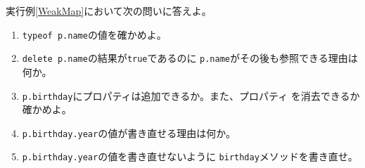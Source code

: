 \begin{Prob}\upshape
実行例\else\ref{WeakMap}\fi において次の問いに答えよ。
\begin{enumerate}
   \item \texttt{typeof p.name}の値を確かめよ。\ifText\vspace{0.03\textheight}\fi
   \item \texttt{delete p.name}の結果が\texttt{true}であるのに
         \texttt{p.name}がその後も参照できる理由は何か。\ifText\vspace{0.03\textheight}\fi
   \item \texttt{p.birthday}にプロパティは追加できるか。また、プロパティ
         を消去できるか確かめよ。\ifText\vspace{0.05\textheight}\fi
   \item \texttt{p.birthday.year}の値が書き直せる理由は何か。\ifText\vspace{0.03\textheight}\fi
   \item \texttt{p.birthday.year}の値を書き直せないように
         \texttt{birthday}メソッドを書き直せ。\ifText\vspace{0.07\textheight}\fi
\end{enumerate}
\end{Prob}

